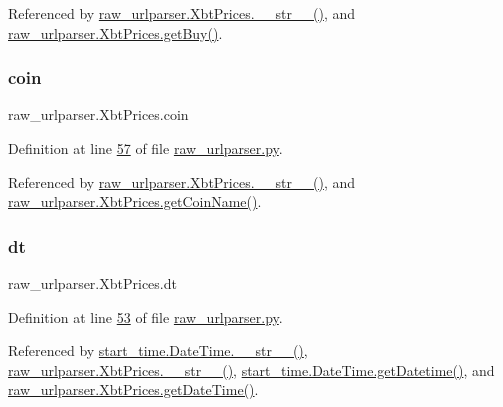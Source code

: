 Referenced by \hyperlink{raw__urlparser_8py_source_l00074}{raw\+\_\+urlparser.\+Xbt\+Prices.\+\_\+\+\_\+str\+\_\+\+\_\+()}, and \hyperlink{raw__urlparser_8py_source_l00062}{raw\+\_\+urlparser.\+Xbt\+Prices.\+get\+Buy()}.

\mbox{\label{classraw__urlparser_1_1_xbt_prices_a8d253ccd987bce28e3aaba7a9c486e5f}} 
\subsubsection{\texorpdfstring{coin}{coin}}
{\footnotesize\ttfamily raw\+\_\+urlparser.\+Xbt\+Prices.\+coin}



Definition at line \hyperlink{raw__urlparser_8py_source_l00057}{57} of file \hyperlink{raw__urlparser_8py_source}{raw\+\_\+urlparser.\+py}.



Referenced by \hyperlink{raw__urlparser_8py_source_l00074}{raw\+\_\+urlparser.\+Xbt\+Prices.\+\_\+\+\_\+str\+\_\+\+\_\+()}, and \hyperlink{raw__urlparser_8py_source_l00071}{raw\+\_\+urlparser.\+Xbt\+Prices.\+get\+Coin\+Name()}.

\mbox{\label{classraw__urlparser_1_1_xbt_prices_ae094aa3e73d21d0be219a085f09bcf13}} 
\subsubsection{\texorpdfstring{dt}{dt}}
{\footnotesize\ttfamily raw\+\_\+urlparser.\+Xbt\+Prices.\+dt}



Definition at line \hyperlink{raw__urlparser_8py_source_l00053}{53} of file \hyperlink{raw__urlparser_8py_source}{raw\+\_\+urlparser.\+py}.



Referenced by \hyperlink{start__time_2____init_____8py_source_l00034}{start\+\_\+time.\+Date\+Time.\+\_\+\+\_\+str\+\_\+\+\_\+()}, \hyperlink{raw__urlparser_8py_source_l00074}{raw\+\_\+urlparser.\+Xbt\+Prices.\+\_\+\+\_\+str\+\_\+\+\_\+()}, \hyperlink{start__time_2____init_____8py_source_l00031}{start\+\_\+time.\+Date\+Time.\+get\+Datetime()}, and \hyperlink{raw__urlparser_8py_source_l00059}{raw\+\_\+urlparser.\+Xbt\+Prices.\+get\+Date\+Time()}.

